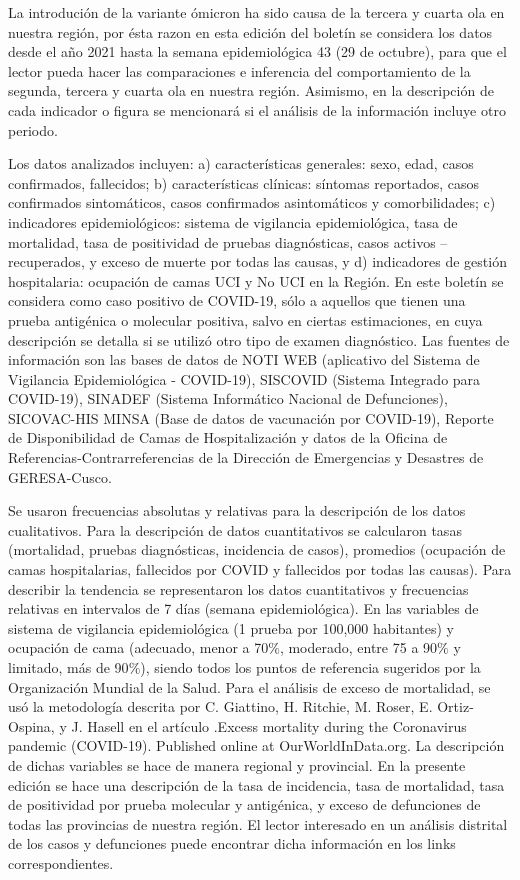 \documentclass[12pt,a4paper,openany]{book}
\begin{document}
	La introdución de la variante ómicron ha sido causa de la tercera y cuarta ola en nuestra región, por ésta razon en esta edición del boletín se considera los datos desde el año 2021 hasta la
	semana epidemiológica  43 (29 de octubre), para que el lector pueda hacer las comparaciones
	e inferencia del comportamiento de la segunda, tercera y cuarta ola en nuestra región. Asimismo, en la descripción de cada indicador o figura se mencionará si el análisis de
	la información incluye otro periodo.
	
	Los datos analizados incluyen: a) características generales: sexo, edad, casos confirmados,
	fallecidos; b) características clínicas: síntomas reportados, casos confirmados sintomáticos, casos
	confirmados asintomáticos y comorbilidades; c) indicadores epidemiológicos: sistema de vigilancia
	epidemiológica, tasa de mortalidad, tasa de positividad de pruebas diagnósticas, casos activos –
	recuperados, y exceso de muerte por todas las causas, y d) indicadores de gestión hospitalaria: 
	ocupación de camas UCI y No UCI en la Región. En este boletín se considera como caso positivo de
	COVID-19, sólo a aquellos que tienen una prueba antigénica o molecular positiva, salvo en ciertas
	estimaciones, en cuya descripción se detalla si se utilizó otro tipo de examen diagnóstico.
	Las fuentes de información son las bases de datos de NOTI WEB (aplicativo del Sistema de
	Vigilancia Epidemiológica - COVID-19), SISCOVID (Sistema Integrado para COVID-19), SINADEF
	(Sistema Informático Nacional de Defunciones), SICOVAC-HIS MINSA (Base de datos de vacunación
	por COVID-19), Reporte de Disponibilidad de Camas de Hospitalización y datos de la Oficina de
	Referencias-Contrarreferencias de la Dirección de Emergencias y Desastres de GERESA-Cusco.

	Se usaron frecuencias absolutas y relativas para la descripción de los datos cualitativos. Para la
	descripción de datos cuantitativos se calcularon tasas (mortalidad, pruebas diagnósticas, incidencia de
	casos), promedios (ocupación de camas hospitalarias, fallecidos por COVID y fallecidos por todas las
	causas). Para describir la tendencia se representaron los datos cuantitativos y frecuencias relativas en
	intervalos de 7 días (semana epidemiológica). En las variables de sistema de vigilancia epidemiológica
		(1 prueba por 100,000 habitantes) y ocupación de cama (adecuado, menor a 70$\%$, moderado,
	entre 75 a 90$\%$ y limitado, más de 90$\%$), siendo todos los puntos de referencia sugeridos por la
	Organización Mundial de la Salud. Para el análisis de exceso de mortalidad, se usó la metodología
	descrita por C. Giattino, H. Ritchie, M. Roser, E. Ortiz-Ospina, y J. Hasell en el artículo .Excess
	mortality during the Coronavirus pandemic (COVID-19). Published online at OurWorldInData.org.
	La descripción de dichas variables se hace de manera regional y provincial. En la presente edición
	se hace una descripción de la tasa de incidencia, tasa de mortalidad, tasa de positividad por prueba
	molecular y antigénica, y exceso de defunciones de todas las provincias de nuestra región. El lector
	interesado en un análisis distrital de los casos y defunciones puede encontrar dicha información en
	los links correspondientes.
	
\end{document}
